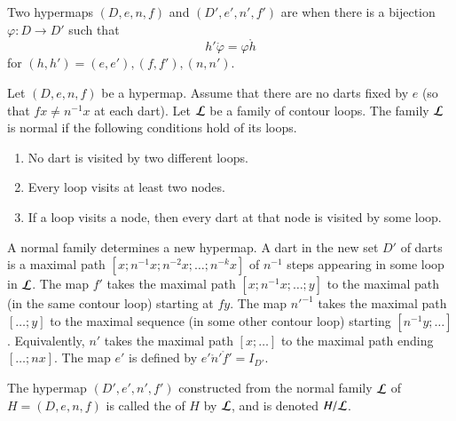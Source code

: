 \begin{definition}[isomorphic] Two hypermaps $(D,e,n,f)$ and
$(D',e',n',f')$ are  when there is a bijection
$\varphi:D\to D'$ such that
\begin{displaymath}h'\ocirc \varphi = \varphi\ocirc h\end{displaymath}
for $(h,h')=(e,e'), (f,f'), (n,n')$.
%
%
\end{definition}


\begin{definition}
Let $(D,e,n,f)$ be a hypermap. Assume that 
there are no darts fixed by $e$ 
(so that $f x \ne n^{-1} x$ at each dart). 
Let $\cal L$ be a family of contour
loops.  The family $\cal L$ is  normal if the following
conditions hold of its loops. \begin{enumerate}
\item  No dart is visited by two different loops.
\item  Every loop visits at least two nodes.
\item  If a loop visits a node, then every dart at that node is visited
by some loop.
\end{enumerate}
%
\end{definition}

A normal family determines a new hypermap.  A dart in the new set $D'$
of darts is a maximal path $[x;n^{-1} x; n^{-2} x;\ldots;n^{-k}
x]$ of $n^{-1}$ steps appearing in some loop in $\cal L$. The map $f'$
takes the maximal path $[x;n^{-1}x;\ldots;y]$ to the maximal path (in
the same contour loop) starting at $f y$. The map ${n'}^{-1}$ takes
the maximal path $[\ldots;y]$ to the maximal sequence (in some other
contour loop) starting $[n^{-1}y;\ldots]$. Equivalently, $n'$ takes
the maximal path $[x;\ldots]$ to the maximal path ending $[\ldots;n
x]$. The map $e'$ is defined by $e'\ocirc n'\ocirc f' = I_{D'}$.
%

\begin{definition}[quotient] The hypermap $(D',e',n',f')$
constructed from the normal
family $\cal L$ of $H=(D,e,n,f)$ 
is called the  of $H$ by $\cal L$, and is denoted
$H/{\cal L}$.  
%
\end{definition}
%
%
%
%

